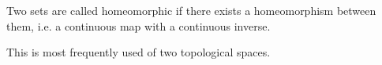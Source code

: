 Two sets are called homeomorphic if there exists a homeomorphism between
them, i.e. a continuous map with a continuous inverse.
\par
This is most frequently used of two topological spaces.